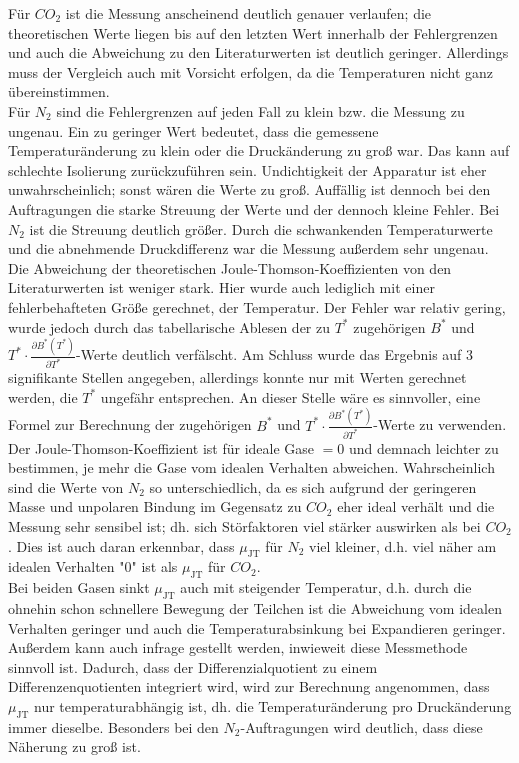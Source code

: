 \documentclass[a4paper,12pt,oneside,onecolum,final,openany]{report}
\begin{document}
Für $CO_2$ ist die Messung anscheinend deutlich genauer verlaufen; die theoretischen Werte liegen bis auf den letzten Wert innerhalb der Fehlergrenzen und auch die Abweichung zu den Literaturwerten ist deutlich geringer. Allerdings muss der Vergleich auch mit Vorsicht erfolgen, da die Temperaturen nicht ganz übereinstimmen.\\

Für $N_2$ sind die Fehlergrenzen auf jeden Fall zu klein bzw. die Messung zu ungenau. Ein zu geringer Wert bedeutet, dass die gemessene Temperaturänderung zu klein oder die Druckänderung zu groß war. Das kann auf schlechte Isolierung zurückzuführen sein. Undichtigkeit der Apparatur ist eher unwahrscheinlich; sonst wären die Werte zu groß. Auffällig ist dennoch bei den Auftragungen die starke Streuung der Werte und der dennoch kleine Fehler. Bei $N_2$ ist die Streuung deutlich größer. Durch die schwankenden Temperaturwerte und die abnehmende Druckdifferenz war die Messung außerdem sehr ungenau.\\
  
Die Abweichung der theoretischen Joule-Thomson-Koeffizienten von den Literaturwerten ist weniger stark. Hier wurde auch lediglich mit einer fehlerbehafteten Größe gerechnet, der Temperatur. Der Fehler war relativ gering, wurde jedoch durch das tabellarische Ablesen der zu $T^*$ zugehörigen $B^*$ und $T^* \cdot \frac{\partial B^*(T^*)}{\partial T^*}$-Werte deutlich verfälscht. Am Schluss wurde das Ergebnis auf 3 signifikante Stellen angegeben, allerdings konnte nur mit Werten gerechnet werden, die $T^*$ ungefähr entsprechen. An dieser Stelle wäre es sinnvoller, eine Formel zur Berechnung der zugehörigen $B^*$ und $T^* \cdot \frac{\partial B^*(T^*)}{\partial T^*}$-Werte zu verwenden.\\

Der Joule-Thomson-Koeffizient ist für ideale Gase $=0$ und demnach leichter zu bestimmen, je mehr die Gase vom idealen Verhalten abweichen. Wahrscheinlich sind die Werte von $N_2$ so unterschiedlich, da es sich aufgrund der geringeren Masse und unpolaren Bindung im Gegensatz zu $CO_2$ eher ideal verhält und die Messung sehr sensibel ist; dh. sich Störfaktoren viel stärker auswirken als bei $CO_2$. Dies ist auch daran erkennbar, dass $\mu_\mathrm{JT}$ für $N_2$ viel kleiner, d.h. viel näher am idealen Verhalten "0" ist als $\mu_\mathrm{JT}$ für $CO_2$.\\
Bei beiden Gasen sinkt $\mu_\mathrm{JT}$ auch mit steigender Temperatur, d.h. durch die ohnehin schon schnellere Bewegung der Teilchen ist die Abweichung vom idealen Verhalten geringer und auch die Temperaturabsinkung bei Expandieren geringer.\\
 Außerdem kann auch infrage gestellt werden, inwieweit diese Messmethode sinnvoll ist. Dadurch, dass der Differenzialquotient zu einem Differenzenquotienten integriert wird, wird zur Berechnung angenommen, dass $\mu_\mathrm{JT}$ nur temperaturabhängig ist, dh. die Temperaturänderung pro Druckänderung immer dieselbe. Besonders bei den $N_2$-Auftragungen wird deutlich, dass diese Näherung zu groß ist.\\ 
 
\end{document}
